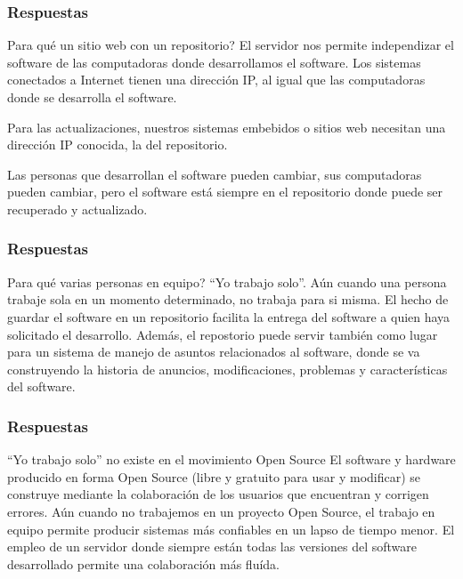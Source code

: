 \documentclass{beamer}
\begin{document}
\begin{frame}
\frametitle{Respuestas}

\begin{block}{\textquestiondown Para qu\'{e} un sitio web con un repositorio?}
El servidor nos permite independizar el software de las computadoras donde desarrollamos el software. 
Los sistemas conectados a Internet tienen una direcci\'{o}n IP, al igual que las computadoras donde se desarrolla el software. 

Para las actualizaciones, nuestros sistemas embebidos o sitios web necesitan una direcci\'{o}n IP conocida, la del repositorio.

Las personas que desarrollan el software pueden cambiar, sus computadoras pueden cambiar, pero el software est\'{a} siempre en el repositorio donde puede ser recuperado y actualizado. 
\end{block}

\end{frame}

\begin{frame}
\frametitle{Respuestas}

\begin{block}{\textquestiondown Para qu\'{e} varias personas en equipo? ``Yo trabajo solo''.}
Aún cuando una persona trabaje sola en un momento determinado, no trabaja para si misma. El hecho de guardar el software en un repositorio facilita la entrega del software a quien haya solicitado el desarrollo. Además, el repostorio puede servir también como lugar para un sistema de manejo de asuntos relacionados al software, donde se va construyendo la historia de anuncios, modificaciones, problemas y características del software.
\end{block}
\end{frame}



\begin{frame}
\frametitle{Respuestas}

\begin{block}{``Yo trabajo solo'' no existe en el movimiento Open Source}
El software y hardware producido en forma Open Source (libre y gratuito para usar y modificar) se construye mediante la colaboración de los usuarios que encuentran y corrigen errores. Aún cuando no trabajemos en un proyecto Open Source, el trabajo en equipo permite producir sistemas más confiables en un lapso de tiempo menor. El empleo de un servidor donde siempre están todas las versiones del software desarrollado permite una colaboración más fluída.
\end{block}
\end{frame}
\end{document}
